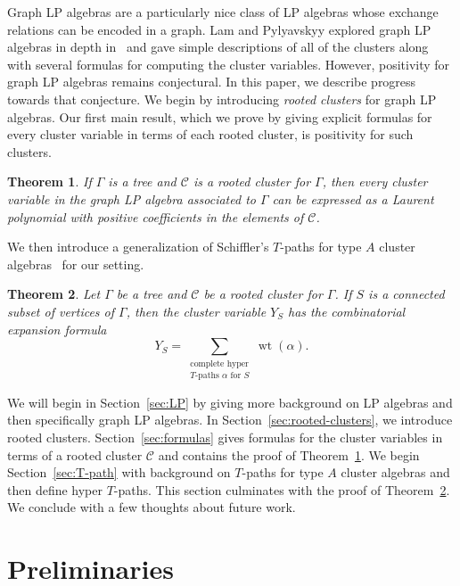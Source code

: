 \documentclass[10pt,a4paper]{amsart}
\numberwithin{equation}{section}
\newtheorem{Theorem}{Theorem}[section]
\DeclareMathOperator{\wt}{wt}
\newcommand{\calC}{\mathcal{C}}
\begin{document}
Graph LP algebras are a particularly nice class of LP algebras whose exchange relations can be encoded in a graph. Lam and Pylyavskyy explored graph LP algebras in depth in~\cite{LP-16} and gave simple descriptions of all of the clusters along with several formulas for computing the cluster variables. However, positivity for graph LP algebras remains conjectural. In this paper, we describe progress towards that conjecture.
We begin by introducing \emph{rooted clusters} for graph LP algebras. Our first main result, which we prove by giving explicit formulas for every cluster variable in terms of each rooted cluster, is positivity for such clusters.
\begin{Theorem}\label{thm:main1}
If $\Gamma$ is a tree and $\calC$ is a rooted cluster for $\Gamma$, then every cluster variable in the graph LP algebra associated to $\Gamma$ can be expressed as a Laurent polynomial with positive coefficients in the elements of $\calC$.
\end{Theorem}
We then introduce a generalization of Schiffler's $T$-paths for type $A$ cluster algebras~\cite{S-08} for our setting.

\begin{Theorem}
\label{thm:main2}
Let $\Gamma$ be a tree and $\calC$ be a rooted cluster for $\Gamma$. If $S$ is a connected subset of vertices of $\Gamma$, then the cluster variable $Y_S$ has the combinatorial expansion formula \[Y_S=\sum_{\substack{\text{complete hyper}\\T\text{-paths }\alpha\text{ for }S}}\wt(\alpha).\]
\end{Theorem}

We will begin in Section~\ref{sec:LP} by giving more background on LP algebras and then specifically graph LP algebras. In Section~\ref{sec:rooted-clusters}, we introduce rooted clusters. Section~\ref{sec:formulas} gives formulas for the cluster variables in terms of a rooted cluster $\calC$ and contains the proof of Theorem~\ref{thm:main1}. We begin Section~\ref{sec:T-path} with background on $T$-paths for type $A$ cluster algebras and then define hyper $T$-paths. This section culminates with the proof of Theorem~\ref{thm:main2}. We conclude with a few thoughts about future work.
\section{Preliminaries}\label{sec:prelim}
\end{document}
